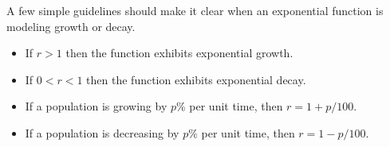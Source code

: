     A few simple guidelines should make it clear when an exponential function is modeling
growth or decay.  
\begin{itemize}
    \item If $r > 1$ then the function exhibits exponential growth.
    \item If $0 < r < 1$ then the function exhibits exponential decay.
    \item If a population is growing by $p\%$ per unit time, then $r = 1+p/100$.
    \item If a population is decreasing by $p\%$ per unit time, then $r = 1-p/100$.
\end{itemize}




